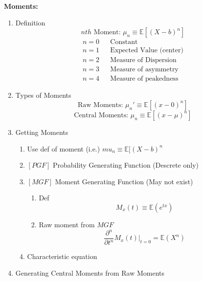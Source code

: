 \documentclass[12pt]{article}
\renewcommand{\=}[1]{\stackrel{#1}{=}} %
\theoremstyle{definition}
\theoremstyle{remark}
\begin{document}
  \newpage
  \textbf{Moments:}
  \begin{enumerate}
  \item Definition 
    \begin{equation}
      nth\textrm{ Moment: }\mu_n \equiv \mathbb{E}[(X-b)^n]
    \end{equation}
    \begin{align*}
      n = 0& & \textrm{Constant}\\
      n = 1& & \textrm{Expected Value (center)}\\
      n = 2& & \textrm{Measure of Dispersion}\\
      n = 3& & \textrm{Measure of asymmetry}\\
      n = 4& & \textrm{Measure of peakedness}
    \end{align*}
  \item Types of Moments
    \begin{equation}
      \textrm{Raw Moments: } \mu_n' \equiv \mathbb{E}[(x-0)^n]
    \end{equation}
    \begin{equation}
      \textrm{Central Moments: } \mu_n \equiv \mathbb{E}[(x-\mu)^n]
    \end{equation}
  \item Getting Moments
    \begin{enumerate}
    \item Use def of moment (i.e.) $mu_n \equiv \mathbb{E}[(X-b)^n$
    \item $[PGF]$ Probability Generating Function (Descrete only)
    \item $[MGF]$ Moment Generating Function (May not exist)
      \begin{enumerate}
      \item Def
        \begin{equation}
          M_x(t) \equiv \mathbb{E}(e^{tx})
        \end{equation}
      \item Raw moment from $MGF$
        \begin{equation}
          \frac{\partial^n}{\partial t^n} M_x(t)|_{t=0} = \mathbb{E}(X^n)
        \end{equation}
      \end{enumerate}
    \item Characteristic equation
    \end{enumerate}
  \item Generating Central Moments from Raw Moments
    \begin{equation}

\end{equation}
\end{enumerate}
\end{document}
